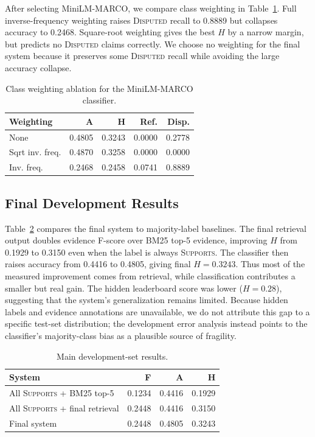 \documentclass[11pt]{article}
\begin{document}
After selecting MiniLM-MARCO, we compare class weighting in Table~\ref{tab:weighting}. Full inverse-frequency weighting raises \textsc{Disputed} recall to 0.8889 but collapses accuracy to 0.2468. Square-root weighting gives the best $H$ by a narrow margin, but predicts no \textsc{Disputed} claims correctly. We choose no weighting for the final system because it preserves some \textsc{Disputed} recall while avoiding the large accuracy collapse.

\begin{table}[t]
  \centering
  \small
  \setlength{\tabcolsep}{4pt}
  \begin{tabular}{lrrrr}
    \toprule
    \textbf{Weighting} & \textbf{A} & \textbf{H} & \textbf{Ref.} & \textbf{Disp.} \\
    \midrule
    None & 0.4805 & 0.3243 & 0.0000 & 0.2778 \\
    Sqrt inv. freq. & 0.4870 & 0.3258 & 0.0000 & 0.0000 \\
    Inv. freq. & 0.2468 & 0.2458 & 0.0741 & 0.8889 \\
    \bottomrule
  \end{tabular}
  \caption{Class weighting ablation for the MiniLM-MARCO classifier.}
  \label{tab:weighting}
\end{table}

\subsection{Final Development Results}

Table~\ref{tab:main-results} compares the final system to majority-label baselines. The final retrieval output doubles evidence F-score over BM25 top-5 evidence, improving $H$ from 0.1929 to 0.3150 even when the label is always \textsc{Supports}. The classifier then raises accuracy from 0.4416 to 0.4805, giving final $H=0.3243$. Thus most of the measured improvement comes from retrieval, while classification contributes a smaller but real gain. The hidden leaderboard score was lower ($H=0.28$), suggesting that the system's generalization remains limited. Because hidden labels and evidence annotations are unavailable, we do not attribute this gap to a specific test-set distribution; the development error analysis instead points to the classifier's majority-class bias as a plausible source of fragility.

\begin{table}[t]
  \centering
  \small
  \setlength{\tabcolsep}{4pt}
  \begin{tabular}{lrrr}
    \toprule
    \textbf{System} & \textbf{F} & \textbf{A} & \textbf{H} \\
    \midrule
    All \textsc{Supports} + BM25 top-5 & 0.1234 & 0.4416 & 0.1929 \\
    All \textsc{Supports} + final retrieval & 0.2448 & 0.4416 & 0.3150 \\
    Final system & 0.2448 & 0.4805 & 0.3243 \\
    \bottomrule
  \end{tabular}
  \caption{Main development-set results.}
  \label{tab:main-results}
\end{table}
\end{document}
